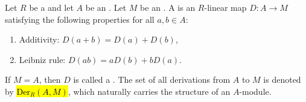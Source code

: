 \begin{definition} \label{definition:derivation_in_an_algebra_over_a_ring}
    Let $R$ be a  and let $A$ be an . Let $M$ be an . 
    A  is an $R$-linear map $D: A \to M$ satisfying the following properties for all $a, b \in A$:
    \begin{enumerate}
        \item Additivity: $D(a + b) = D(a) + D(b)$,
        \item Leibniz rule: $D(ab) = aD(b) + bD(a)$.
    \end{enumerate}

    If $M = A$, then $D$ is called a . The set of all derivations from $A$ to $M$ is denoted by \hl{$\mathrm{Der}_R(A, M)$}, which naturally carries the structure of an $A$-module.
\end{definition}
